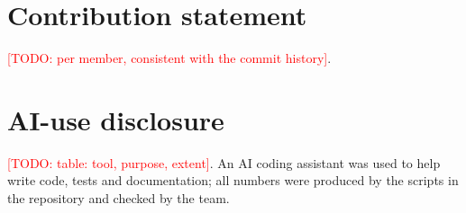 \documentclass[11pt,a4paper]{article}
\newcommand{\todo}[1]{\textcolor{red}{[TODO: #1]}}
\begin{document}
\section*{Contribution statement}
\todo{per member, consistent with the commit history}.

\section*{AI-use disclosure}
\todo{table: tool, purpose, extent}. An AI coding assistant was used to help write code, tests and
documentation; all numbers were produced by the scripts in the repository and checked by the team.



\end{document}
